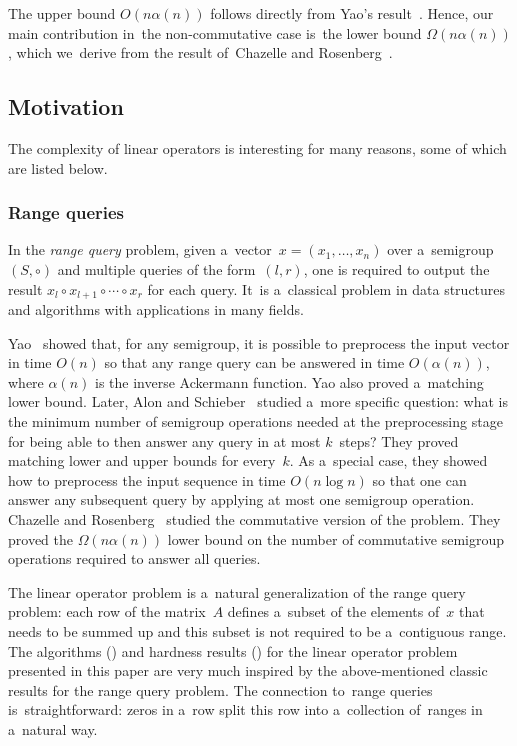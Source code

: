 The upper bound $O(n\alpha(n))$ follows directly
from Yao's result~\cite{DBLP:conf/stoc/Yao82}.
Hence, our main contribution in~the non-commutative case
is~the lower bound $\Omega(n\alpha(n))$,
which we~derive from the result
of~Chazelle and Rosenberg~\cite{DBLP:journals/ijcga/ChazelleR91}.

\subsection{Motivation}
The complexity of linear operators is interesting for many reasons, some of
which are listed below.

%
%
%
\subsubsection{Range queries}  In the
%
%
\emph{range query} problem,
%
%
%
%
%
 given a~vector~$x=(x_1, \dotsc, x_n)$ over a~semigroup $(S, \circ)$ and
multiple queries of the form~$(l,r)$, one is required to
output the result $x_l \circ x_{l+1} \circ \dotsb \circ x_r$
for each query. It~is a~classical problem in data structures and
algorithms with applications in many fields.

Yao~\cite{DBLP:conf/stoc/Yao82} showed that, for any semigroup, it is possible
to preprocess the input vector in time $O(n)$ so that
%
%
%
any range query can be answered %
in time $O(\alpha(n))$, where $\alpha(n)$ is the inverse Ackermann
%
function.  Yao also  %
proved a~matching lower bound.
%
Later, Alon and
Schieber~\cite{Alon87optimalpreprocessing} studied a~more specific question:
what is the minimum number of semigroup operations needed at the preprocessing
stage for being able to then answer any query in at most $k$~steps? They proved
matching lower and upper bounds for every~$k$. As a~special case, they showed
how to preprocess the input sequence in time $O(n\log n)$
%
so that one can %
answer any
subsequent query by applying at most one semigroup operation.
Chazelle and Rosenberg~\cite{DBLP:journals/ijcga/ChazelleR91} studied the
commutative version of the problem. They proved the $\Omega(n \alpha(n))$ lower
bound on the number of commutative semigroup operations required to answer all
queries.

The linear operator problem is a~natural generalization of the
%
%
range query problem:
each row of the matrix~$A$ defines a~subset of the elements of~$x$
that needs to be summed up and this subset is not required to be
a~contiguous range. The algorithms () and hardness
results () for the linear operator problem presented
in this paper are very much inspired by the above-mentioned classic results for
%
%
the range query problem.
The connection to~range queries is~straightforward:
zeros in a~row split this row into a~collection of~ranges in a~natural way.

